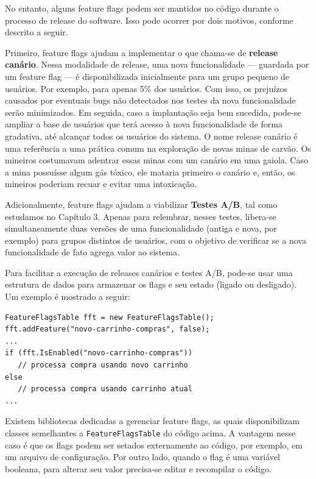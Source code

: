 \documentclass[
  11pt,
  twoside]{book}
\newcommand{\passthrough}[1]{#1}
\begin{document}
No entanto, alguns feature flags podem ser mantidos no código durante o
processo de release do software. Isso pode ocorrer por dois motivos,
conforme descrito a seguir.

 Primeiro, feature flags ajudam a implementar o
que chama-se de \textbf{release canário}. Nessa modalidade de release,
uma nova funcionalidade --- guardada por um feature flag --- é
disponibilizada inicialmente para um grupo pequeno de usuários. Por
exemplo, para apenas 5\% dos usuários. Com isso, os prejuízos causados
por eventuais bugs não detectados nos testes da nova funcionalidade
serão minimizados. Em seguida, caso a implantação seja bem sucedida,
pode-se ampliar a base de usuários que terá acesso à nova funcionalidade
de forma gradativa, até alcançar todos os usuários do sistema. O nome
release canário é uma referência a uma prática comum na exploração de
novas minas de carvão. Os mineiros costumavam adentrar essas minas com
um canário em uma gaiola. Caso a mina possuísse algum gás tóxico, ele
mataria primeiro o canário e, então, os mineiros poderiam recuar e
evitar uma intoxicação.

 Adicionalmente, feature flags ajudam a viabilizar
\textbf{Testes A/B}, tal como estudamos no Capítulo 3. Apenas para
relembrar, nesses testes, libera-se simultaneamente duas versões de uma
funcionalidade (antiga e nova, por exemplo) para grupos distintos de
usuários, com o objetivo de verificar se a nova funcionalidade de fato
agrega valor ao sistema.

Para facilitar a execução de releases canários e testes A/B, pode-se
usar uma estrutura de dados para armazenar os flags e seu estado (ligado
ou desligado). Um exemplo é mostrado a seguir:

\begin{lstlisting}
FeatureFlagsTable fft = new FeatureFlagsTable();
fft.addFeature("novo-carrinho-compras", false);
...
if (fft.IsEnabled("novo-carrinho-compras"))
   // processa compra usando novo carrinho
else 
   // processa compra usando carrinho atual
...      
\end{lstlisting}

Existem bibliotecas dedicadas a gerenciar feature flags, as quais
disponibilizam classes semelhantes a
\passthrough{\lstinline!FeatureFlagsTable!} do código acima. A vantagem
nesse caso é que os flags podem ser setados externamente ao código, por
exemplo, em um arquivo de configuração. Por outro lado, quando o flag é
uma variável booleana, para alterar seu valor precisa-se editar e
recompilar o código.
\end{document}
